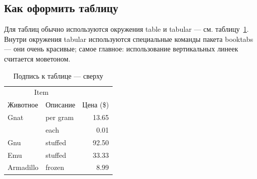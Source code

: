 \subsection{Как оформить таблицу}

Для таблиц обычно используются окружения table и tabular --- см. таблицу~\ref{tab:widgets}. Внутри окружения tabular используются специальные команды пакета booktabs — они очень красивые; самое главное: использование вертикальных линеек считается моветоном.

\begin{table}
\centering
\caption{\label{tab:widgets}Подпись к таблице --- сверху}
\begin{tabular}{llr}
\toprule
\multicolumn{2}{c}{Item} \\
\cmidrule(r){1-2}
Животное  & Описание    & Цена (\$) \\
\midrule
Gnat      & per gram    & 13.65      \\
          & each        & 0.01       \\
Gnu       & stuffed     & 92.50      \\
Emu       & stuffed     & 33.33      \\
Armadillo & frozen      & 8.99       \\
\bottomrule
\end{tabular}
\end{table}

\fi


